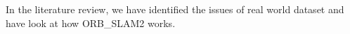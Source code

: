 In the literature review, we have identified the issues of real world dataset and have look at how ORB\_SLAM2 works.